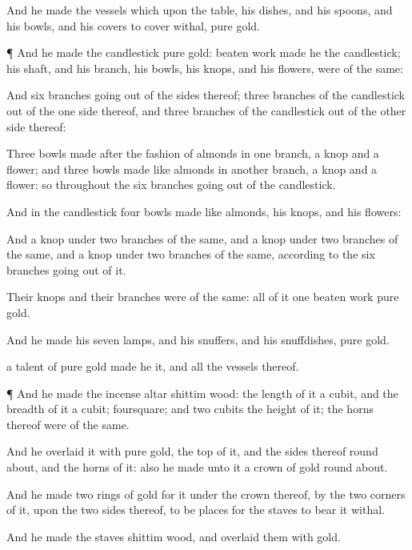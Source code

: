 {And he
made the
vessels which
{} upon the
table, his
dishes, and his
spoons, and his
bowls, and his
covers to
cover
withal,
{}
pure
gold.


\par }{\PP {}¶ And he
made the
candlestick
{}
pure
gold:
{} beaten
work
made he the
candlestick; his
shaft, and his
branch, his
bowls, his
knops, and his
flowers, were of the same:

And
six
branches going
out of the
sides thereof;
three
branches of the
candlestick out of the
one
side thereof, and
three
branches of the
candlestick out of the
other
side thereof:

Three
bowls made after the fashion of
almonds in
one
branch, a
knop and a
flower; and
three
bowls made like
almonds in
another
branch, a
knop and a
flower: so throughout the
six
branches going
out of the
candlestick.

And in the
candlestick
{}
four
bowls made like
almonds, his
knops, and his
flowers:

And a
knop under
two
branches of the same, and a
knop under
two
branches of the same, and a
knop under
two
branches of the same, according to the
six
branches going
out of it.

Their
knops and their
branches were of the same: all of it
{}
one beaten
work
{}
pure
gold.

And he
made his
seven
lamps, and his
snuffers, and his
snuffdishes,
{}
pure
gold.

 a
talent of
pure
gold
made he it, and all the
vessels thereof.


\par }{\PP {}¶ And he
made the
incense
altar
{}
shittim
wood: the
length of it
{} a
cubit, and the
breadth of it a
cubit;
{}
foursquare; and two
cubits
{} the
height of it; the
horns thereof were of the same.

And he
overlaid it with
pure
gold,
{} the
top of it, and the
sides thereof round
about, and the
horns of it: also he
made unto it a
crown of
gold round
about.

And he
made
two
rings of
gold for it under the
crown thereof, by the
two
corners of it, upon the
two
sides thereof, to be
places for the
staves to
bear it withal.

And he
made the
staves
{}
shittim
wood, and
overlaid them with
gold.


}
